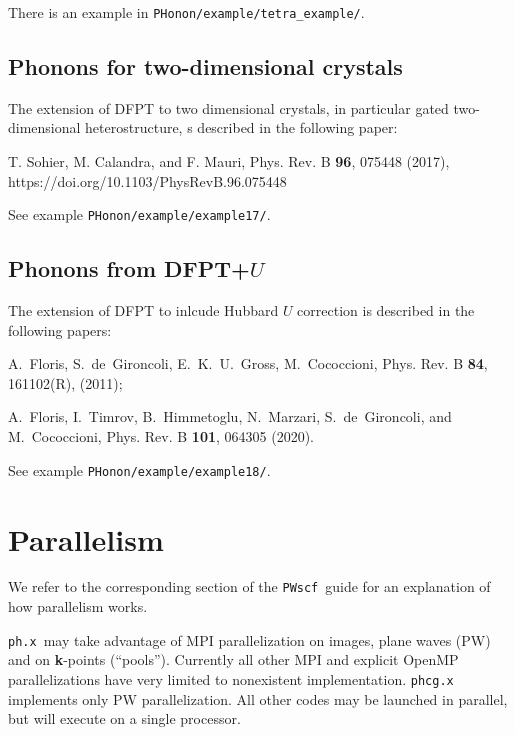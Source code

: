 \documentclass[12pt,a4paper]{article}
\def\phx{\texttt{ph.x}}
\def\PWscf{\texttt{PWscf}}
\begin{document}
There is an example in \verb|PHonon/example/tetra_example/|.

\subsection{Phonons for two-dimensional crystals}

The extension of DFPT to two dimensional crystals,
in particular gated two-dimensional heterostructure,
s described in the following paper:

T. Sohier, M. Calandra, and F. Mauri, Phys. Rev. B {\bf 96}, 075448 (2017),
https://doi.org/10.1103/PhysRevB.96.075448

See example  \verb|PHonon/example/example17/|.

\subsection{Phonons from DFPT+$U$}

The extension of DFPT to inlcude Hubbard $U$ correction is described
in the following papers:

A.~Floris, S.~de~Gironcoli, E.~K.~U.~Gross, M.~Cococcioni, Phys. Rev. B {\bf 84}, 
161102(R), (2011);

A.~Floris, I.~Timrov, B.~Himmetoglu, N.~Marzari, S.~de~Gironcoli, and M.~Cococcioni, 
Phys. Rev. B {\bf 101}, 064305 (2020).

See example  \verb|PHonon/example/example18/|.

\section{Parallelism}
\label{Sec:para}

We refer to the corresponding section of the \PWscf\ guide for
an explanation of how parallelism works. 

\phx\ may take advantage of MPI parallelization on images, plane waves (PW) 
and on {\bf k}-points (``pools''). Currently all other MPI and explicit 
OpenMP parallelizations have very limited to nonexistent implementation.
\texttt{phcg.x} implements only PW parallelization.
All other codes may be launched in parallel, but will execute 
on a single processor.
\end{document}
